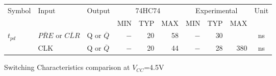 \begin{tabular}{|l|l|l|r|r|r|r|r|r|c|}
    \toprule
    Symbol  &Input  &Output &\multicolumn{3}{|c|}{74HC74}&\multicolumn{3}{|c|}{Experimental}&Unit\\
            &       &       &       MIN&TYP&MAX          &          MIN&TYP&MAX             &    \\
    \midrule
    \multirow{2}{*}{$t_{pd}$}   &$\overline{PRE}$ or $\overline{CLR}$&Q or $\overline{Q}$&$-$&20&58&$-$&30&   &ns\\
                                &CLK&Q or $\overline{Q}$&$-$&20&44&$-$&28&380&ns\\
    \bottomrule
\end{tabular}
\caption{Switching Characteristics comparison at $V_{CC}$=4.5V}